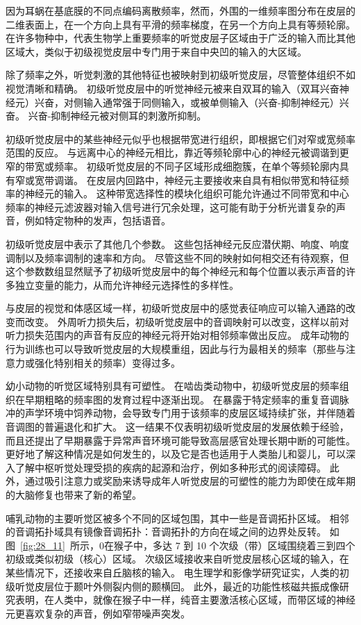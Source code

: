 因为耳蜗在基底膜的不同点编码离散频率，然而，外围的一维频率图分布在皮层的二维表面上，在一个方向上具有平滑的频率梯度，在另一个方向上具有等频轮廓。
在许多物种中，代表生物学上重要频率的听觉皮层子区域由于广泛的输入而比其他区域大，类似于初级视觉皮层中专门用于来自中央凹的输入的大区域。


除了频率之外，听觉刺激的其他特征也被映射到初级听觉皮层，尽管整体组织不如视觉清晰和精确。
初级听觉皮层中的听觉神经元被来自双耳的输入（双耳兴奋神经元）兴奋，对侧输入通常强于同侧输入，或被单侧输入（兴奋-抑制神经元）兴奋。
兴奋-抑制神经元被对侧耳的刺激所抑制。


初级听觉皮层中的某些神经元似乎也根据带宽进行组织，即根据它们对窄或宽频率范围的反应。
与远离中心的神经元相比，靠近等频轮廓中心的神经元被调谐到更窄的带宽或频率。
初级听觉皮层的不同子区域形成细胞簇，在单个等频轮廓内具有窄或宽带调谐。
在皮层内回路中，神经元主要接收来自具有相似带宽和特征频率的神经元的输入。
这种带宽选择性的模块化组织可能允许通过不同带宽和中心频率的神经元滤波器对输入信号进行冗余处理，这可能有助于分析光谱复杂的声音，例如特定物种的发声，包括语音。


初级听觉皮层中表示了其他几个参数。
这些包括神经元反应潜伏期、响度、响度调制以及频率调制的速率和方向。
尽管这些不同的映射如何相交还有待观察，但这个参数数组显然赋予了初级听觉皮层中的每个神经元和每个位置以表示声音的许多独立变量的能力，从而允许神经元选择性的多样性。


与皮层的视觉和体感区域一样，初级听觉皮层中的感觉表征响应可以输入通路的改变而改变。
外周听力损失后，初级听觉皮层中的音调映射可以改变，这样以前对听力损失范围内的声音有反应的神经元将开始对相邻频率做出反应。
成年动物的行为训练也可以导致听觉皮层的大规模重组，因此与行为最相关的频率（那些与注意力或强化特别相关的频率）变得过多\cite{zhang2001persistent,merzenich1975representation}。


幼小动物的听觉区域特别具有可塑性。
在啮齿类动物中，初级听觉皮层的频率组织在早期粗略的频率图的发育过程中逐渐出现。
在暴露于特定频率的重复音调脉冲的声学环境中饲养动物，会导致专门用于该频率的皮层区域持续扩张，并伴随着音调图的普遍退化和扩大。
这一结果不仅表明初级听觉皮层的发展依赖于经验，而且还提出了早期暴露于异常声音环境可能导致高层感官处理长期中断的可能性。
更好地了解这种情况是如何发生的，以及它是否也适用于人类胎儿和婴儿，可以深入了解中枢听觉处理受损的疾病的起源和治疗，例如多种形式的阅读障碍。
此外，通过吸引注意力或奖励来诱导成年人听觉皮层的可塑性的能力为即使在成年期的大脑修复也带来了新的希望。


哺乳动物的主要听觉区被多个不同的区域包围，其中一些是音调拓扑区域。
相邻的音调拓扑域具有镜像音调拓扑：音调拓扑的方向在域之间的边界处反转。
如图~\ref{fig:28_11}~所示，0在猴子中，多达 7 到 10 个次级（带）区域围绕着三到四个初级或类似初级（核心）区域。
次级区域接收来自听觉皮层核心区域的输入，在某些情况下，还接收来自丘脑核的输入。
电生理学和影像学研究证实，人类的初级听觉皮层位于颞叶外侧裂内侧的颞横回。
此外，最近的功能性核磁共振成像研究表明，在人类中，就像在猴子中一样，纯音主要激活核心区域，而带区域的神经元更喜欢复杂的声音，例如窄带噪声突发。



